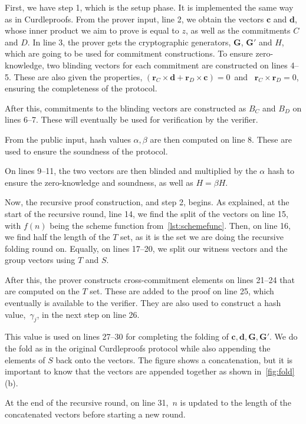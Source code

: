 First, we have step 1, which is the setup phase.
It is implemented the same way as in Curdleproofs.
From the prover input, line 2, we obtain the vectors $\mathbf{c}$ and $\mathbf{d}$, whose inner product we aim to prove is equal to $z$, as well as the commitments $C$ and $D$.
In line 3, the prover gets the cryptographic generators, $\mathbf{G}$, $\mathbf{G}'$ and $H$, which are going to be used for commitment constructions.
To ensure zero-knowledge, two blinding vectors for each commitment are constructed on lines 4--5.
These are also given the properties, $(\mathbf{r}_C\times \mathbf{d}+\mathbf{r}_D\times \mathbf{c})=0$~and~ $\mathbf{r}_C\times\mathbf{r}_D=0$, ensuring the completeness of the protocol.

After this, commitments to the blinding vectors are constructed as $B_C$ and $B_D$ on lines 6--7.
These will eventually be used for verification by the verifier.

From the public input, hash values $\alpha,\beta$ are then computed on line 8.
These are used to ensure the soundness of the protocol.

On lines 9--11, the two vectors are then blinded and multiplied by the $\alpha$ hash to ensure the zero-knowledge and soundness, as well as $H=\beta H$.


Now, the recursive proof construction, and step 2, begins.
As explained, at the start of the recursive round, line 14, we find the split of the vectors on line 15, with $f(n)$ being the scheme function from~\autoref{lst:schemefunc}.
Then, on line 16, we find half the length of the $T$ set, as it is the set we are doing the recursive folding round on.
Equally, on lines 17--20, we split our witness vectors and the group vectors using $T$ and $S$.

After this, the prover constructs cross-commitment elements on lines 21--24 that are computed on the $T$ set.
These are added to the proof on line 25, which eventually is available to the verifier.
They are also used to construct a hash value,~$\gamma_j$, in the next step on line 26.

This value is used on lines 27--30 for completing the folding of $\mathbf{c},\mathbf{d},\mathbf{G},\mathbf{G'}$.
We do the fold as in the original Curdleproofs protocol while also appending the elements of $S$ back onto the vectors.
The figure shows a concatenation, but it is important to know that the vectors are appended together as shown in~\autoref{fig:fold}(b).

At the end of the recursive round, on line 31,~$n$ is updated to the length of the concatenated vectors before starting a new round.

